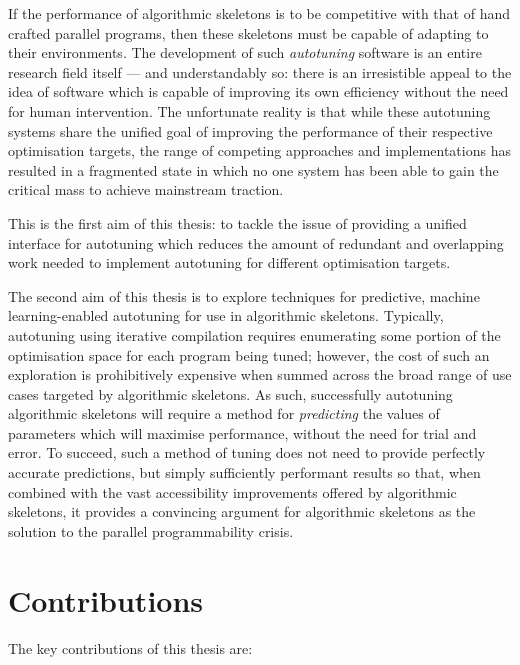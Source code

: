 
If the performance of algorithmic skeletons is to be competitive with
that of hand crafted parallel programs, then these skeletons must be
capable of adapting to their environments. The development of such
\emph{autotuning} software is an entire research field itself --- and
understandably so: there is an irresistible appeal to the idea of
software which is capable of improving its own efficiency without the
need for human intervention. The unfortunate reality is that while
these autotuning systems share the unified goal of improving the
performance of their respective optimisation targets, the range of
competing approaches and implementations has resulted in a fragmented
state in which no one system has been able to gain the critical mass
to achieve mainstream traction.

This is the first aim of this thesis: to tackle the issue of providing
a unified interface for autotuning which reduces the amount of
redundant and overlapping work needed to implement autotuning for
different optimisation targets.


The second aim of this thesis is to explore techniques for predictive,
machine learning-enabled autotuning for use in algorithmic
skeletons. Typically, autotuning using iterative compilation requires
enumerating some portion of the optimisation space for each program
being tuned; however, the cost of such an exploration is prohibitively
expensive when summed across the broad range of use cases targeted by
algorithmic skeletons. As such, successfully autotuning algorithmic
skeletons will require a method for \emph{predicting} the values of
parameters which will maximise performance, without the need for trial
and error. To succeed, such a method of tuning does not need to
provide perfectly accurate predictions, but simply sufficiently
performant results so that, when combined with the vast accessibility
improvements offered by algorithmic skeletons, it provides a
convincing argument for algorithmic skeletons as the solution to the
parallel programmability crisis.


\section{Contributions}

The key contributions of this thesis are:

